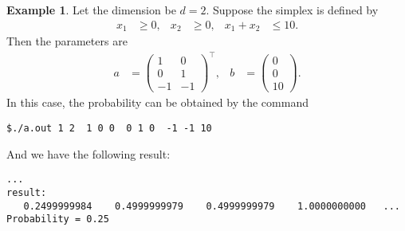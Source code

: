 \documentclass[12pt]{article}
\theoremstyle{definition}
\newtheorem{example}{Example}
\begin{document}
\begin{example}
Let the dimension be $d=2$.
Suppose the simplex is defined by 
\begin{align*}
  x_1 &\geq 0, & x_2&\geq 0, & x_1+x_2&\leq 10.
\end{align*}
Then the parameters are
\begin{align*}
  a &= \begin{pmatrix} 1 & 0 \\ 0 & 1 \\ -1 & -1  \end{pmatrix}^\top, &
  b &= \begin{pmatrix} 0 \\ 0 \\ 10 \end{pmatrix}.
\end{align*}
In this case, the probability can be obtained by the command
\begin{framed}
\begin{verbatim}
$./a.out 1 2  1 0 0  0 1 0  -1 -1 10
\end{verbatim}
\end{framed}
And we have the following result:
\begin{framed}
\begin{verbatim}
...
result:
   0.2499999984    0.4999999979    0.4999999979    1.0000000000   ...
Probability = 0.25
\end{verbatim}
\end{framed}
\end{example}
\fi
\end{document}
